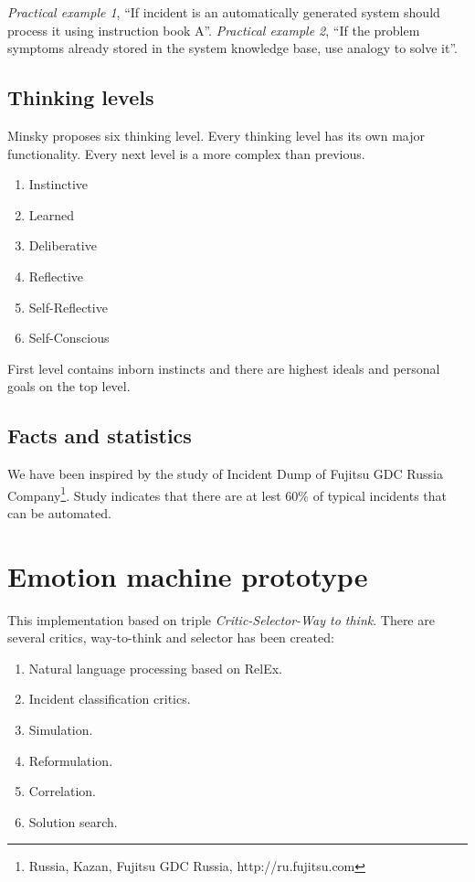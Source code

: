 \documentclass[runningheads,a4paper]{llncs}
\begin{document}
\emph{Practical example 1}, “If incident is an automatically generated system should process it using instruction book A”.
\emph{Practical example 2}, “If the problem symptoms already stored in the system knowledge base, use analogy to solve it”. 

\subsection{Thinking levels}

Minsky proposes six thinking level. Every thinking level has its own major functionality. Every next level is a more complex than previous.

\begin{enumerate}
 \item Instinctive
 \item Learned
 \item Deliberative
 \item Reflective
 \item Self-Reflective
 \item Self-Conscious
\end{enumerate}

First level contains inborn instincts and there are highest ideals and personal goals on the top level.

\subsection{Facts and statistics}
We have been inspired by the study of Incident Dump of Fujitsu GDC Russia Company\footnote{Russia, Kazan, Fujitsu GDC Russia, http://ru.fujitsu.com}. Study indicates that there are at lest 60\% of typical incidents that can be automated.

\section{Emotion machine prototype}
This implementation based on triple \emph{Critic-Selector-Way to think}. There are several critics, way-to-think and selector has been created:

\begin{enumerate}
 \item Natural language processing based on RelEx.
 \item Incident classification critics.
 \item Simulation.
 \item Reformulation.
 \item Correlation.
 \item Solution search.
\end{enumerate}
\end{document}
